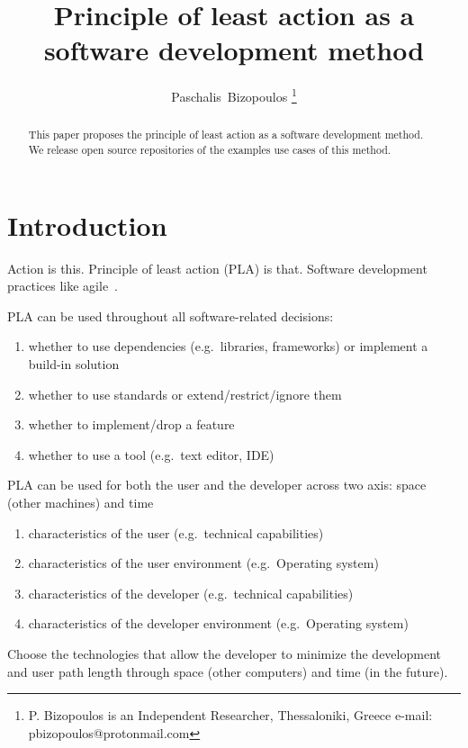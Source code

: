 \documentclass[journal]{IEEEtran}
\begin{document}
\title{Principle of least action as a software development method}

\author{Paschalis~Bizopoulos
\thanks{P. Bizopoulos is an Independent Researcher, Thessaloniki, Greece e-mail: pbizopoulos@protonmail.com}}

\maketitle

\begin{abstract}
	This paper proposes the principle of least action as a software development method.
	We release open source repositories of the examples use cases of this method.
\end{abstract}

\section{Introduction}
Action is this.
Principle of least action (PLA) is that.
Software development practices like agile~\cite{abrahamsson2017agile}.

PLA can be used throughout all software-related decisions:
\begin{enumerate}
	\item whether to use dependencies (e.g.\ libraries, frameworks) or implement a build-in solution
	\item whether to use standards or extend/restrict/ignore them
	\item whether to implement/drop a feature
	\item whether to use a tool (e.g.\ text editor, IDE)
\end{enumerate}

PLA can be used for both the user and the developer across two axis: space (other machines) and time
\begin{enumerate}
	\item characteristics of the user (e.g.\ technical capabilities)
	\item characteristics of the user environment (e.g.\ Operating system)
	\item characteristics of the developer (e.g.\ technical capabilities)
	\item characteristics of the developer environment (e.g.\ Operating system)
\end{enumerate}
Choose the technologies that allow the developer to minimize the development and user path length through space (other computers) and time (in the future).
\end{document}
